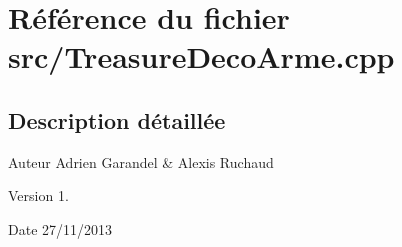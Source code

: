 \section{Référence du fichier src/\-Treasure\-Deco\-Arme.cpp}
\label{_treasure_deco_arme_8cpp}


\subsection{Description détaillée}
\begin{DoxyAuthor}{Auteur}
Adrien Garandel \& Alexis Ruchaud 
\end{DoxyAuthor}
\begin{DoxyVersion}{Version}
1. 
\end{DoxyVersion}
\begin{DoxyDate}{Date}
27/11/2013 
\end{DoxyDate}
